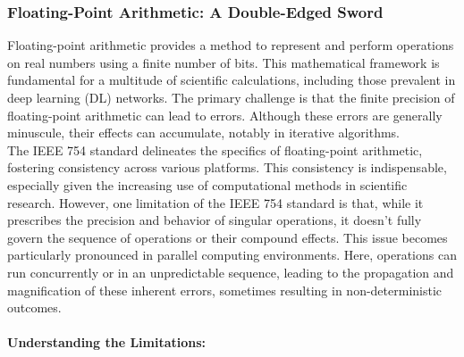 \subsubsection*{Floating-Point Arithmetic: A Double-Edged Sword}

Floating-point arithmetic provides a method to represent and perform operations on real numbers using a finite number of bits. This mathematical framework is fundamental for a multitude of scientific calculations, including those prevalent in deep learning (DL) networks. The primary challenge is that the finite precision of floating-point arithmetic can lead to errors. Although these errors are generally minuscule, their effects can accumulate, notably in iterative algorithms.\\

The IEEE 754 standard delineates the specifics of floating-point arithmetic, fostering consistency across various platforms. This consistency is indispensable, especially given the increasing use of computational methods in scientific research. However, one limitation of the IEEE 754 standard is that, while it prescribes the precision and behavior of singular operations, it doesn't fully govern the sequence of operations or their compound effects. This issue becomes particularly pronounced in parallel computing environments. Here, operations can run concurrently or in an unpredictable sequence, leading to the propagation and magnification of these inherent errors, sometimes resulting in non-deterministic outcomes.

\paragraph{Understanding the Limitations:}

